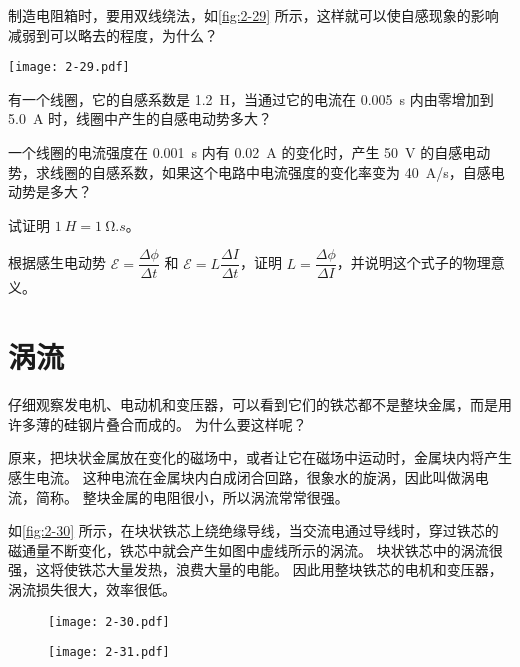 \begin{Practice}
\begin{question}
  \item 制造电阻箱时，要用双线绕法，如\cref{fig:2-29} 所示，这样就可以使自感现象的影响减弱到可以略去的程度，为什么？
  \begin{figurehere}
    \begin{minipage}{\linewidth}\centering
      \texttt{[image: 2-29.pdf]}
      \caption{}\label{fig:2-29}
    \end{minipage}
  \end{figurehere}
  \item 有一个线圈，它的自感系数是 \qty{1.2}{H}，当通过它的电流在 \qty{0.005}{s} 内由零增加到 \qty{5.0}{A} 时，线圈中产生的自感电动势多大？
  \item 一个线圈的电流强度在 \qty{0.001}{s} 内有 \qty{0.02}{A} 的变化时，产生 \qty{50}{V} 的自感电动势，求线圈的自感系数，如果这个电路中电流强度的变化率变为 \qty{40}{A/s}，自感电动势是多大？
  \item 试证明 $\qty{1}{H}=\qty{1}{\ohm.s}$。
  \item 根据感生电动势 $\mathcal{E}=\dfrac{\Delta \phi}{\Delta t}$ 和 $\mathcal{E}=L\dfrac{\Delta I}{\Delta t}$，证明 $L=\dfrac{\Delta \phi}{\Delta I}$，并说明这个式子的物理意义。
\end{question}
\end{Practice}

\section{涡流}

仔细观察发电机、电动机和变压器，可以看到它们的铁芯都不是整块金属，而是用许多薄的硅钢片叠合而成的。
为什么要这样呢？

原来，把块状金属放在变化的磁场中，或者让它在磁场中运动时，金属块内将产生感生电流。
这种电流在金属块内白成闭合回路，很象水的旋涡，因此叫做涡电流，简称。
整块金属的电阻很小，所以涡流常常很强。

如\cref{fig:2-30} 所示，在块状铁芯上绕绝缘导线，当交流电通过导线时，穿过铁芯的磁通量不断变化，铁芯中就会产生如图中虚线所示的涡流。
块状铁芯中的涡流很强，这将使铁芯大量发热，浪费大量的电能。
因此用整块铁芯的电机和变压器，涡流损失很大，效率很低。

\begin{figure}
	\begin{minipage}[b]{0.48\linewidth}\centering
    \texttt{[image: 2-30.pdf]}
		\caption{}\label{fig:2-30}
	\end{minipage}
	\begin{minipage}[b]{0.48\linewidth}\centering
    \texttt{[image: 2-31.pdf]}
    \caption{}\label{fig:2-31}
	\end{minipage}
\end{figure}


